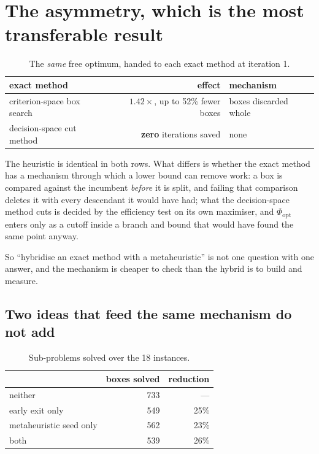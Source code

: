 \documentclass[11pt,a4paper]{article}
\begin{document}
\section{The asymmetry, which is the most transferable result}

\begin{table}[h]
\centering
\caption{The \emph{same} free optimum, handed to each exact method at
iteration 1.}
\begin{tabular}{lrl}
\toprule
exact method & effect & mechanism \\
\midrule
criterion-space box search & $1.42\times$, up to 52\% fewer boxes
  & boxes discarded whole \\
decision-space cut method  & \textbf{zero} iterations saved
  & none \\
\bottomrule
\end{tabular}
\end{table}

\noindent
The heuristic is identical in both rows.  What differs is whether the exact
method has a mechanism through which a lower bound can remove work: a box is
compared against the incumbent \emph{before} it is split, and failing that
comparison deletes it with every descendant it would have had; what the
decision-space method cuts is decided by the efficiency test on its own
maximiser, and $\Phi_{\mathrm{opt}}$ enters only as a cutoff inside a branch
and bound that would have found the same point anyway.

So ``hybridise an exact method with a metaheuristic'' is not one question with
one answer, and the mechanism is cheaper to check than the hybrid is to build
and measure.

\subsection{Two ideas that feed the same mechanism do not add}

\begin{table}[h]
\centering
\caption{Sub-problems solved over the 18 instances.}
\begin{tabular}{lrr}
\toprule
 & boxes solved & reduction \\
\midrule
neither                       & 733 & --- \\
early exit only               & 549 & 25\% \\
metaheuristic seed only       & 562 & 23\% \\
both                          & 539 & 26\% \\
\bottomrule
\end{tabular}
\end{table}
\end{document}
